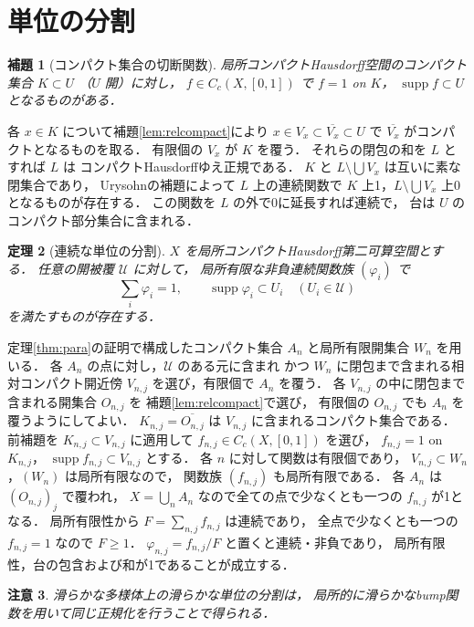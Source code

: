 \documentclass[a5paper,10pt,onecolumn]{jsarticle}
\makeatletter
\theoremstyle{mathnotetheorem}
\newtheorem{theorem}{定理}[section]
\newtheorem{lemma}[theorem]{補題}
\newtheorem{remark}[theorem]{注意}
\renewcommand{\proofname}{証明}
\renewenvironment{proof}[1][\proofname]{%
  \par\pushQED{\qed}\normalfont\topsep4\p@\@plus2\p@\relax
  \trivlist\item[\hskip\labelsep\bfseries #1]\ignorespaces
}{\popQED\endtrivlist\@endpefalse}
\makeatother
\begin{document}
\section{単位の分割}
\begin{lemma}[コンパクト集合の切断関数]
局所コンパクトHausdorff空間のコンパクト集合 $K\subset U$
（$U$ 開）に対し，
$f\in C_c(X,[0,1])$ で $f=1$ on $K$，
$\operatorname{supp}f\subset U$ となるものがある．
\end{lemma}
\begin{proof}
各 $x\in K$ について補題\ref{lem:relcompact}により
$x\in V_x\subset\overline{V_x}\subset U$ で
$\overline{V_x}$ がコンパクトとなるものを取る．
有限個の $V_x$ が $K$ を覆う．
それらの閉包の和を $L$ とすれば $L$ は
コンパクトHausdorffゆえ正規である．
$K$ と $L\setminus\bigcup V_x$ は互いに素な閉集合であり，
Urysohnの補題によって $L$ 上の連続関数で
$K$ 上1，$L\setminus\bigcup V_x$ 上0となるものが存在する．
この関数を $L$ の外で0に延長すれば連続で，
台は $U$ のコンパクト部分集合に含まれる．
\end{proof}
\begin{theorem}[連続な単位の分割]\label{thm:partition}
$X$ を局所コンパクトHausdorff第二可算空間とする．
任意の開被覆 $\mathcal U$ に対して，
局所有限な非負連続関数族 $(\varphi_i)$ で
\[
 \sum_i\varphi_i=1,\qquad
 \operatorname{supp}\varphi_i\subset U_i
 \quad(U_i\in\mathcal U)
\]
を満たすものが存在する．
\end{theorem}
\begin{proof}
定理\ref{thm:para}の証明で構成したコンパクト集合
$A_n$ と局所有限開集合 $W_n$ を用いる．
各 $A_n$ の点に対し，$\mathcal U$ のある元に含まれ
かつ $W_n$ に閉包まで含まれる相対コンパクト開近傍
$V_{n,j}$ を選び，有限個で $A_n$ を覆う．
各 $V_{n,j}$ の中に閉包まで含まれる開集合 $O_{n,j}$ を
補題\ref{lem:relcompact}で選び，
有限個の $O_{n,j}$ でも $A_n$ を覆うようにしてよい．
$K_{n,j}=\overline{O_{n,j}}$ は
$V_{n,j}$ に含まれるコンパクト集合である．
前補題を $K_{n,j}\subset V_{n,j}$ に適用して
$f_{n,j}\in C_c(X,[0,1])$ を選び，
$f_{n,j}=1$ on $K_{n,j}$，
$\operatorname{supp}f_{n,j}\subset V_{n,j}$ とする．
各 $n$ に対して関数は有限個であり，
$V_{n,j}\subset W_n$，$(W_n)$ は局所有限なので，
関数族 $(f_{n,j})$ も局所有限である．
各 $A_n$ は $(O_{n,j})_j$ で覆われ，
$X=\bigcup_nA_n$ なので全ての点で少なくとも一つの
$f_{n,j}$ が1となる．
局所有限性から $F=\sum_{n,j} f_{n,j}$ は連続であり，
全点で少なくとも一つの $f_{n,j}=1$ なので $F\ge1$．
$\varphi_{n,j}=f_{n,j}/F$ と置くと連続・非負であり，
局所有限性，台の包含および和が1であることが成立する．
\end{proof}
\begin{remark}
滑らかな多様体上の滑らかな単位の分割は，
局所的に滑らかなbump関数を用いて同じ正規化を行うことで得られる．
\end{remark}
\end{document}
